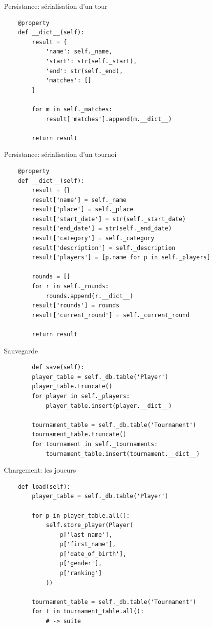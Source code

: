 \begin{frame}[fragile]{Persistance: sérialisation d'un tour}
  \footnotesize
  \begin{verbatim}
    @property
    def __dict__(self):
        result = {
            'name': self._name,
            'start': str(self._start),
            'end': str(self._end),
            'matches': []
        }

        for m in self._matches:
            result['matches'].append(m.__dict__)

        return result
  \end{verbatim}
\end{frame}

\begin{frame}[fragile]{Persistance: sérialisation d'un tournoi}
  \footnotesize
  \begin{verbatim}
    @property
    def __dict__(self):
        result = {}
        result['name'] = self._name
        result['place'] = self._place
        result['start_date'] = str(self._start_date)
        result['end_date'] = str(self._end_date)
        result['category'] = self._category
        result['description'] = self._description
        result['players'] = [p.name for p in self._players]

        rounds = []
        for r in self._rounds:
            rounds.append(r.__dict__)
        result['rounds'] = rounds
        result['current_round'] = self._current_round

        return result
  \end{verbatim}
\end{frame}

\begin{frame}[fragile]{Sauvegarde}
  \footnotesize
  \begin{verbatim}
        def save(self):
        player_table = self._db.table('Player')
        player_table.truncate()
        for player in self._players:
            player_table.insert(player.__dict__)

        tournament_table = self._db.table('Tournament')
        tournament_table.truncate()
        for tournament in self._tournaments:
            tournament_table.insert(tournament.__dict__)
  \end{verbatim}
\end{frame}

\begin{frame}[fragile]{Chargement: les joueurs}
  \footnotesize
  \begin{verbatim}
    def load(self):
        player_table = self._db.table('Player')

        for p in player_table.all():
            self.store_player(Player(
                p['last_name'],
                p['first_name'],
                p['date_of_birth'],
                p['gender'],
                p['ranking']
            ))

        tournament_table = self._db.table('Tournament')
        for t in tournament_table.all():
            # -> suite
  \end{verbatim}
\end{frame}

